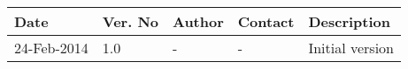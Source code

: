 \begin{center}
    \begin{tabular}{ | l | p{1cm} | l | l | p{5cm} |}
    \hline
    Date&Ver. No & Author &Contact &Description\\ \hline
	24-Feb-2014&1.0 & - & - & Initial version\\
    \hline
    \end{tabular}
\end{center}